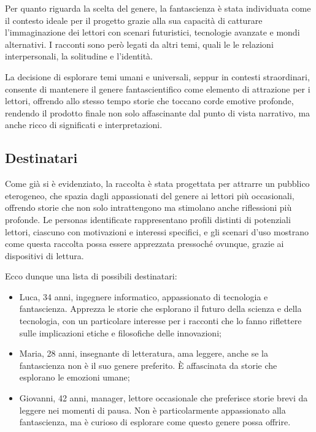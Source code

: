 \documentclass[a4paper,12pt]{article}
\begin{document}
\bigbreak

Per quanto riguarda la scelta del genere, la fantascienza è stata individuata come il contesto ideale per il progetto grazie alla sua capacità di catturare l'immaginazione dei lettori con scenari futuristici, tecnologie avanzate e mondi alternativi. I racconti sono però legati da altri temi, quali le le relazioni interpersonali, la solitudine e l'identità.

\bigbreak

La decisione di esplorare temi umani e universali, seppur in contesti straordinari, consente di mantenere il genere fantascientifico come elemento di attrazione per i lettori, offrendo allo stesso tempo storie che toccano corde emotive profonde, rendendo il prodotto finale non solo affascinante dal punto di vista narrativo, ma anche ricco di significati e interpretazioni.


\subsection*{Destinatari}


Come già si è evidenziato, la raccolta è stata progettata per attrarre un pubblico eterogeneo, che spazia dagli appassionati del genere ai lettori più occasionali, offrendo storie che non solo intrattengono ma stimolano anche riflessioni più profonde. Le personas identificate rappresentano profili distinti di potenziali lettori, ciascuno con motivazioni e interessi specifici, e gli scenari d'uso mostrano come questa raccolta possa essere apprezzata pressoché ovunque, grazie ai dispositivi di lettura.

Ecco dunque una lista di possibili destinatari:

\begin{itemize}
    \item Luca, 34 anni, ingegnere informatico, appassionato di tecnologia e fantascienza. Apprezza le storie che esplorano il futuro della scienza e della tecnologia, con un particolare interesse per i racconti che lo fanno riflettere sulle implicazioni etiche e filosofiche delle innovazioni;
    \item Maria, 28 anni, insegnante di letteratura, ama leggere, anche se la fantascienza non è il suo genere preferito. È affascinata da storie che esplorano le emozioni umane;
    \item Giovanni, 42 anni, manager, lettore occasionale che preferisce storie brevi da leggere nei momenti di pausa. Non è particolarmente appassionato alla fantascienza, ma è curioso di esplorare come questo genere possa offrire.
\end{itemize}
\end{document}
